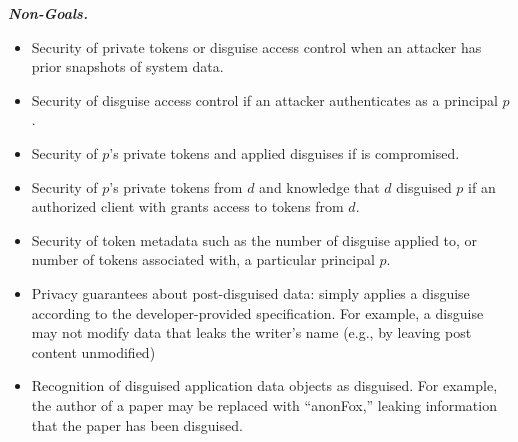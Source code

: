 \vspace{6pt}\noindent\textbf{\emph{Non-Goals.}}
\begin{itemize}
    \item Security of private tokens or disguise access control when an attacker has prior snapshots of system data.
    \item Security of disguise access control if an attacker authenticates as a principal $p$.
    \item Security of $p$'s private tokens and applied disguises if  is compromised.  
    \item Security of $p$'s private tokens from $d$ and knowledge that $d$ disguised $p$ if an authorized client with  grants \sys access to tokens from $d$. 
    \item Security of token metadata such as the number of disguise applied to, or number of tokens associated with, a particular principal $p$.
    \item Privacy guarantees about post-disguised data: \sys simply
        applies a disguise according to the developer-provided specification.  For example, a
        disguise may not modify data that leaks the writer's name (e.g., by leaving post content
        unmodified)
    \item Recognition of disguised application data objects as disguised. For example, the author of a
        paper may be replaced with ``anonFox,'' leaking information that the paper has been
        disguised.
\end{itemize}
